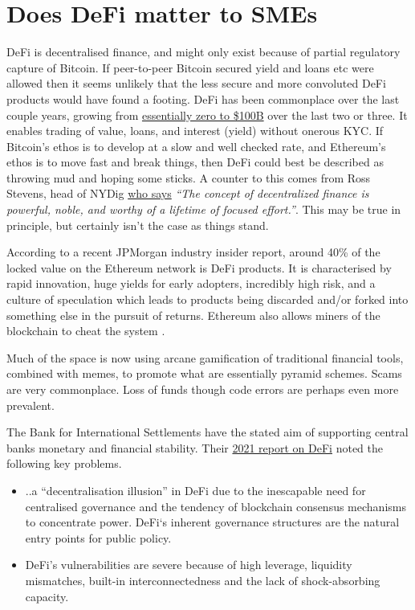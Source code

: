 \section{Does DeFi matter to SMEs }
DeFi is decentralised finance, and might only exist because of partial regulatory capture of Bitcoin. If peer-to-peer Bitcoin secured yield and loans etc were allowed then it seems unlikely that the less secure and more convoluted DeFi products would have found a footing. DeFi  has been commonplace over the last couple years, growing from \href{https://a16zcrypto.com/state-of-crypto-report-a16z-2022/}{essentially zero to \$100B} over the last two or three. It enables trading of value, loans, and interest (yield) without onerous KYC. If Bitcoin's ethos is to develop at a slow and well checked rate, and Ethereum's ethos is to move fast and break things, then DeFi could best be described as throwing mud and hoping some sticks. A counter to this comes from Ross Stevens, head of NYDig \href{https://nydig.com/on-impossible-things-before-breakfast}{who says} \textit{``The concept of decentralized finance is powerful, noble, and worthy of a lifetime of focused effort.''}. This may be true in principle, but certainly isn't the case as things stand.\par
According to a recent JPMorgan industry insider report, around 40\% of the locked value on the Ethereum network is DeFi products. It is characterised by rapid innovation, huge yields for early adopters, incredibly high risk, and a culture of speculation which leads to products being discarded and/or forked into something else in the pursuit of returns. Ethereum also allows miners of the blockchain to cheat the system \cite{piet2022extracting}.\par 
Much of the space is now using arcane gamification of traditional financial tools, combined with memes, to promote what are essentially pyramid schemes. Scams are very commonplace. Loss of funds though code errors are perhaps even more prevalent.\par
The Bank for International Settlements have the stated aim of supporting central banks monetary and financial stability. Their \href{https://www.bis.org/publ/qtrpdf/r_qt2112b.pdf}{2021 report on DeFi} noted the following key problems.
\begin{itemize}
\item ..a ``decentralisation illusion'' in DeFi due to the inescapable need for centralised governance and the tendency of blockchain consensus mechanisms to concentrate power. DeFi`s inherent governance structures are the natural entry points for public policy.
\item DeFi’s vulnerabilities are severe because of high leverage, liquidity mismatches, built-in interconnectedness and the lack of shock-absorbing capacity.
\end{itemize}
